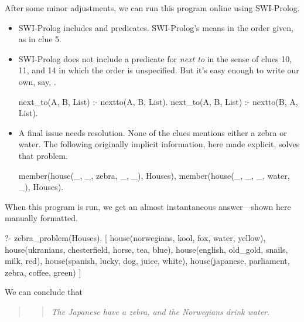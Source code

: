 After some minor adjustments, we can run this program online using SWI-Prolog. 
\begin{itemize}
    \item SWI-Prolog includes  and  predicates. SWI-Prolog's  means in the order given, as in clue 5.

    \item SWI-Prolog does not include a predicate for \textit{next to} in the sense of clues 10, 11, and 14 in which the order is unspecified. But it's easy enough to write our own, say, .
\begin{python}
next_to(A, B, List) :- nextto(A, B, List).
next_to(A, B, List) :- nextto(B, A, List).
\end{python}

    \item A final issue needs resolution. None of the clues mentions either a zebra or water. The following originally implicit information, here made explicit, solves that problem.

\begin{minipage}{\linewidth}
\begin{python}

    member(house(_, _, zebra, _, _), Houses), 
    member(house(_, _, _, water, _), Houses).
\end{python}
\end{minipage}

\end{itemize}

When this program is run, we get an almost instantaneous answer---shown here manually formatted.

\begin{minipage}{\linewidth}
\begin{python}
?- zebra_problem(Houses).
[    
    house(norwegians, kool, fox, water, yellow), 
    house(ukranians, chesterfield, horse, tea, blue), 
    house(english, old_gold, snails, milk, red), 
    house(spanish, lucky, dog, juice, white), 
    house(japanese, parliament, zebra, coffee, green)     
]
\end{python}
\end{minipage}
\smallv

We can conclude that 
\begin{quote} 
\begin{quote} 
\textit{The Japanese have a zebra, and the Norwegians drink water}.
\end{quote} 
\end{quote} 

